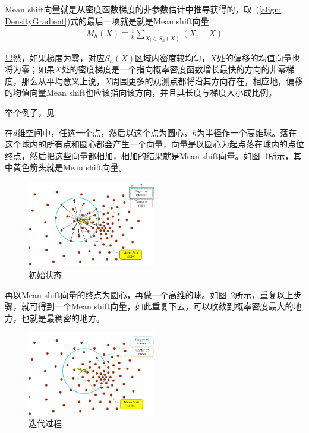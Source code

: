 \documentclass[12pt]{article}
\begin{document}
Mean shift向量就是从密度函数梯度的非参数估计中推导获得的，取~(\ref{align: DensityGradient})式的最后一项就是就是Mean shift向量
\begin{align}
M_h(X) \equiv \frac{1}{k} \sum_{X_i \in S_h(X)} (X_i-X)
\end{align}

显然，如果梯度为零，对应$S_h(X)$区域内密度较均匀，$X$处的偏移的均值向量也将为零；如果$X$处的密度梯度是一个指向概率密度函数增长最快的方向的非零梯度，那么从平均意义上说，$X$周围更多的观测点都将沿其方向存在，相应地，偏移的均值向量Mean shift也应该指向该方向，并且其长度与梯度大小成比例。

举个例子，见\cite{MeanShiftExample}

在$d$维空间中，任选一个点，然后以这个点为圆心，$h$为半径作一个高维球。落在这个球内的所有点和圆心都会产生一个向量，向量是以圆心为起点落在球内的点位终点，然后把这些向量都相加，相加的结果就是Mean shift向量。如图~\ref{fig: meanshift1}所示，其中黄色箭头就是Mean shift向量。

\begin{figure}[!ht]
\centering
\includegraphics[width=0.5\textwidth]{meanshift1.jpg}
\caption{初始状态}
\label{fig: meanshift1}
\end{figure} 


再以Mean shift向量的终点为圆心，再做一个高维的球。如图~\ref{fig: meanshift2}所示，重复以上步骤，就可得到一个Mean shift向量，如此重复下去，可以收敛到概率密度最大的地方，也就是最稠密的地方。

\begin{figure}[!ht]
\centering
\includegraphics[width=0.5\textwidth]{meanshift2.jpg}
\caption{迭代过程}
\label{fig: meanshift2}
\end{figure} 
\end{document}
